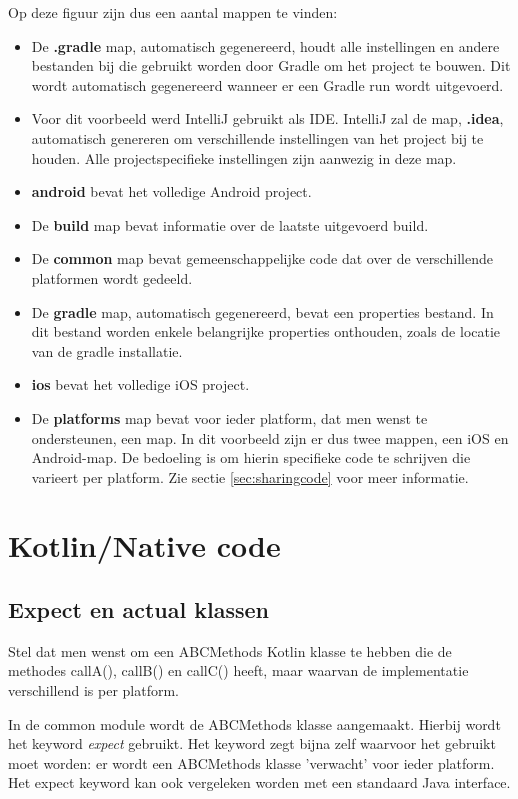 Op deze figuur zijn dus een aantal mappen te vinden:
\begin{itemize}
	\item De \textbf{.gradle} map, automatisch gegenereerd, houdt alle instellingen en andere bestanden bij die gebruikt worden door Gradle om het project te bouwen. Dit wordt automatisch gegenereerd wanneer er een Gradle run wordt uitgevoerd.
	\item Voor dit voorbeeld werd IntelliJ gebruikt als IDE. IntelliJ zal de map, \textbf{.idea}, automatisch genereren om verschillende instellingen van het project bij te houden. Alle projectspecifieke instellingen zijn aanwezig in deze map.
	\item \textbf{android} bevat het volledige Android project.
	\item De \textbf{build} map bevat informatie over de laatste uitgevoerd build.
	\item De \textbf{common} map bevat gemeenschappelijke code dat over de verschillende platformen wordt gedeeld.
	\item De \textbf{gradle} map, automatisch gegenereerd, bevat een properties bestand. In dit bestand worden enkele belangrijke properties onthouden, zoals de locatie van de gradle installatie.
	\item \textbf{ios} bevat het volledige iOS project.
	\item De \textbf{platforms} map bevat voor ieder platform, dat men wenst te ondersteunen, een map. In dit voorbeeld zijn er dus twee mappen, een iOS en Android-map. De bedoeling is om hierin specifieke code te schrijven die varieert per platform. Zie sectie \ref{sec:sharingcode} voor meer informatie.
\end{itemize}

\section{Kotlin/Native code}
\subsection {Expect en actual klassen}
\label{sec:expectandactual}
Stel dat men wenst om een ABCMethods Kotlin klasse te hebben die de methodes callA(), callB() en callC() heeft, maar waarvan de implementatie verschillend is per platform.

In de common module wordt de ABCMethods klasse aangemaakt. Hierbij wordt het keyword \textit{expect} gebruikt. Het keyword zegt bijna zelf waarvoor het gebruikt moet worden: er wordt een ABCMethods klasse 'verwacht' voor ieder platform. Het expect keyword kan ook vergeleken worden met een standaard Java interface.

